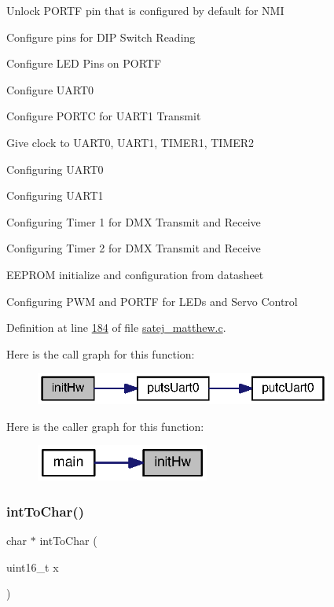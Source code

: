 Unlock P\+O\+R\+TF pin that is configured by default for N\+MI

Configure pins for D\+IP Switch Reading

Configure L\+ED Pins on P\+O\+R\+TF

Configure U\+A\+R\+T0

Configure P\+O\+R\+TC for U\+A\+R\+T1 Transmit

Give clock to U\+A\+R\+T0, U\+A\+R\+T1, T\+I\+M\+E\+R1, T\+I\+M\+E\+R2

Configuring U\+A\+R\+T0

Configuring U\+A\+R\+T1

Configuring Timer 1 for D\+MX Transmit and Receive

Configuring Timer 2 for D\+MX Transmit and Receive

E\+E\+P\+R\+OM initialize and configuration from datasheet

Configuring P\+WM and P\+O\+R\+TF for L\+E\+Ds and Servo Control

Definition at line \mbox{\hyperlink{satej__matthew_8c_source_l00184}{184}} of file \mbox{\hyperlink{satej__matthew_8c_source}{satej\+\_\+matthew.\+c}}.

Here is the call graph for this function\+:\nopagebreak
\begin{figure}[H]
\begin{center}
\leavevmode
\includegraphics[width=277pt]{satej__matthew_8c_ae5e20c90f0611c1fd09fad99cc3a30a6_cgraph}
\end{center}
\end{figure}
Here is the caller graph for this function\+:\nopagebreak
\begin{figure}[H]
\begin{center}
\leavevmode
\includegraphics[width=161pt]{satej__matthew_8c_ae5e20c90f0611c1fd09fad99cc3a30a6_icgraph}
\end{center}
\end{figure}
\mbox{\label{satej__matthew_8c_a48ff33038777eac27bf41ff14b9368bf}} 
\subsubsection{\texorpdfstring{intToChar()}{intToChar()}}
{\footnotesize\ttfamily char $\ast$ int\+To\+Char (\begin{DoxyParamCaption}\item[{uint16\+\_\+t}]{x }\end{DoxyParamCaption})}



